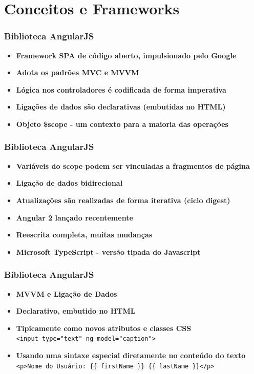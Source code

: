 \documentclass{beamer}
\begin{document}
\section{Conceitos e Frameworks}
\begin{frame}
      \frametitle{Biblioteca AngularJS}

      \begin{itemize}
            \item \textbf{Framework SPA de código aberto, impulsionado pelo Google}
            \item \textbf{Adota os padrões MVC e MVVM}
            \item \textbf{Lógica nos controladores é codificada de forma imperativa}
            \item \textbf{Ligações de dados são declarativas (embutidas no HTML)}
            \item \textbf{Objeto \$scope - um contexto para a maioria das operações}

      \end{itemize}

\end{frame}
\begin{frame}
      \frametitle{Biblioteca AngularJS}

      \begin{itemize}
            \item \textbf{Variáveis do scope podem ser vinculadas a fragmentos de página}
            \item \textbf{Ligação de dados bidirecional}
            \item \textbf{Atualizações são realizadas de forma iterativa (ciclo digest)}
            \item \textbf{Angular 2 lançado recentemente}
            \item \textbf{Reescrita completa, muitas mudanças}
            \item \textbf{Microsoft TypeScript - versão tipada do Javascript}
      \end{itemize}

\end{frame}

\begin{frame}
      \frametitle{Biblioteca AngularJS}

      \begin{itemize}
            \item \textbf{MVVM e Ligação de Dados}
            \item \textbf{Declarativo, embutido no HTML}
            \item \textbf{Tipicamente como novos atributos e classes CSS}
                  \\ \texttt{<input type="text" ng-model="caption">}
            \item \textbf{Usando uma sintaxe especial diretamente no conteúdo do texto}
                  \\ \texttt{<p>Nome do Usuário: \{\{ firstName \}\} \{\{ lastName \}\}</p>}
      \end{itemize}

\end{frame}
\end{document}
